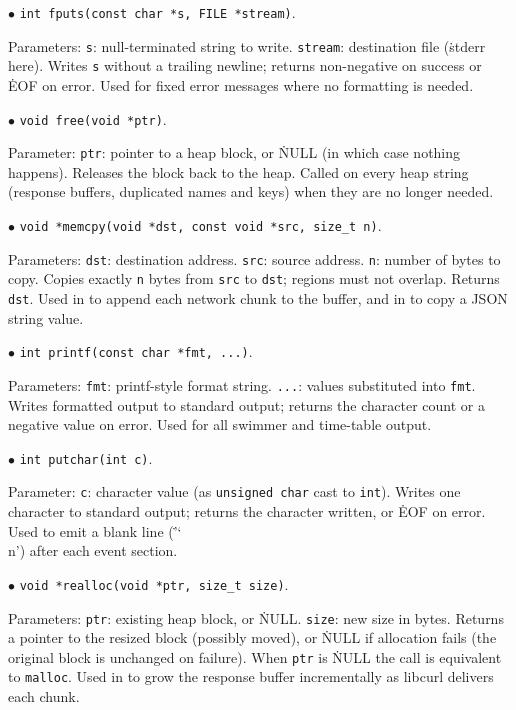 \item{$\bullet$} {\tt int fputs(const char *s, FILE *stream)}.
\par\noindent Parameters:
\itemitem{--} {\tt s}: null-terminated string to write.
\itemitem{--} {\tt stream}: destination file (\.{stderr} here).
Writes {\tt s} without a trailing newline; returns non-negative on
success or \.{EOF} on error.
Used for fixed error messages where no formatting is needed.

\item{$\bullet$} {\tt void free(void *ptr)}.
\par\noindent Parameter:
\itemitem{--} {\tt ptr}: pointer to a heap block, or \.{NULL}
(in which case nothing happens).
Releases the block back to the heap.
Called on every heap string (response buffers, duplicated names and
keys) when they are no longer needed.

\item{$\bullet$} {\tt void *memcpy(void *dst, const void *src, size\_t n)}.
\par\noindent Parameters:
\itemitem{--} {\tt dst}: destination address.
\itemitem{--} {\tt src}: source address.
\itemitem{--} {\tt n}: number of bytes to copy.
Copies exactly {\tt n} bytes from {\tt src} to {\tt dst};
regions must not overlap.
Returns {\tt dst}.
Used in  to append each network chunk to the buffer,
and in  to copy a JSON string value.

\item{$\bullet$} {\tt int printf(const char *fmt, ...)}.
\par\noindent Parameters:
\itemitem{--} {\tt fmt}: printf-style format string.
\itemitem{--} {\tt ...}: values substituted into {\tt fmt}.
Writes formatted output to standard output; returns the character
count or a negative value on error.
Used for all swimmer and time-table output.

\item{$\bullet$} {\tt int putchar(int c)}.
\par\noindent Parameter:
\itemitem{--} {\tt c}: character value (as {\tt unsigned char} cast
to {\tt int}).
Writes one character to standard output; returns the character
written, or \.{EOF} on error.
Used to emit a blank line (\.{'\char`\\n'}) after each event section.

\item{$\bullet$} {\tt void *realloc(void *ptr, size\_t size)}.
\par\noindent Parameters:
\itemitem{--} {\tt ptr}: existing heap block, or \.{NULL}.
\itemitem{--} {\tt size}: new size in bytes.
Returns a pointer to the resized block (possibly moved), or \.{NULL}
if allocation fails (the original block is unchanged on failure).
When {\tt ptr} is \.{NULL} the call is equivalent to {\tt malloc}.
Used in  to grow the response buffer incrementally as
libcurl delivers each chunk.


